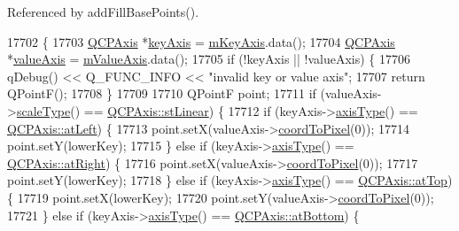 Referenced by add\+Fill\+Base\+Points().


\begin{DoxyCode}
17702                                                           \{
17703   \hyperlink{class_q_c_p_axis}{QCPAxis} *\hyperlink{class_q_c_p_abstract_plottable_a72c7a09c22963f2c943f07112b311103}{keyAxis} = \hyperlink{class_q_c_p_abstract_plottable_a426f42e254d0f8ce5436a868c61a6827}{mKeyAxis}.data();
17704   \hyperlink{class_q_c_p_axis}{QCPAxis} *\hyperlink{class_q_c_p_abstract_plottable_a3106f9d34d330a6097a8ec5905e5b519}{valueAxis} = \hyperlink{class_q_c_p_abstract_plottable_a2901452ca4aea911a1827717934a4bda}{mValueAxis}.data();
17705   \textcolor{keywordflow}{if} (!keyAxis || !valueAxis) \{
17706     qDebug() << Q\_FUNC\_INFO << \textcolor{stringliteral}{"invalid key or value axis"};
17707     \textcolor{keywordflow}{return} QPointF();
17708   \}
17709 
17710   QPointF point;
17711   \textcolor{keywordflow}{if} (valueAxis->\hyperlink{class_q_c_p_axis_a8563e13407bc0616da7f7c84e02de170}{scaleType}() == \hyperlink{class_q_c_p_axis_a36d8e8658dbaa179bf2aeb973db2d6f0aff6e30a11a828bc850caffab0ff994f6}{QCPAxis::stLinear}) \{
17712     \textcolor{keywordflow}{if} (keyAxis->\hyperlink{class_q_c_p_axis_a593c37bf6aa4990326dc09e24f45db7f}{axisType}() == \hyperlink{class_q_c_p_axis_ae2bcc1728b382f10f064612b368bc18aaf84aa6cac6fb6099f54a2cbf7546b730}{QCPAxis::atLeft}) \{
17713       point.setX(valueAxis->\hyperlink{class_q_c_p_axis_a985ae693b842fb0422b4390fe36d299a}{coordToPixel}(0));
17714       point.setY(lowerKey);
17715     \} \textcolor{keywordflow}{else} \textcolor{keywordflow}{if} (keyAxis->\hyperlink{class_q_c_p_axis_a593c37bf6aa4990326dc09e24f45db7f}{axisType}() == \hyperlink{class_q_c_p_axis_ae2bcc1728b382f10f064612b368bc18aadf5509f7d29199ef2f263b1dd224b345}{QCPAxis::atRight}) \{
17716       point.setX(valueAxis->\hyperlink{class_q_c_p_axis_a985ae693b842fb0422b4390fe36d299a}{coordToPixel}(0));
17717       point.setY(lowerKey);
17718     \} \textcolor{keywordflow}{else} \textcolor{keywordflow}{if} (keyAxis->\hyperlink{class_q_c_p_axis_a593c37bf6aa4990326dc09e24f45db7f}{axisType}() == \hyperlink{class_q_c_p_axis_ae2bcc1728b382f10f064612b368bc18aac0ece2b680d3f545e701f75af1655977}{QCPAxis::atTop}) \{
17719       point.setX(lowerKey);
17720       point.setY(valueAxis->\hyperlink{class_q_c_p_axis_a985ae693b842fb0422b4390fe36d299a}{coordToPixel}(0));
17721     \} \textcolor{keywordflow}{else} \textcolor{keywordflow}{if} (keyAxis->\hyperlink{class_q_c_p_axis_a593c37bf6aa4990326dc09e24f45db7f}{axisType}() == \hyperlink{class_q_c_p_axis_ae2bcc1728b382f10f064612b368bc18aa220d68888516b6c3b493d144f1ba438f}{QCPAxis::atBottom}) \{

\end{DoxyCode}
